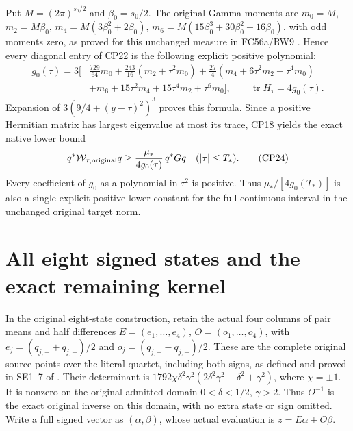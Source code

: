 \documentclass[11pt]{article}
\providecommand{\W}{\mathcal W}
\begin{document}
Put $M=(2\pi)^{s_0/2}$ and $\beta_0=s_0/2$. The original
Gamma moments are
$m_0=M$, $m_2=M\beta_0$,
$m_4=M(3\beta_0^2+2\beta_0)$,
$m_6=M(15\beta_0^3+30\beta_0^2+16\beta_0)$, with odd
moments zero, as proved for this unchanged measure in
FC56a/RW9 \cite{Fable029}. Hence every diagonal entry of CP22 is
the following explicit positive polynomial:
\begin{align}
g_0(\tau)=3\bigg[&
\frac{729}{64}m_0+\frac{243}{16}(m_2+\tau^2m_0)
+\frac{27}{4}(m_4+6\tau^2m_2+\tau^4m_0)\nonumber\\
&+m_6+15\tau^2m_4+15\tau^4m_2+\tau^6m_0\bigg],
\qquad \operatorname{tr}H_\tau=4g_0(\tau).
\tag{CP23}
\end{align}
Expansion of $3(9/4+(y-\tau)^2)^3$ proves this formula.
Since a positive Hermitian matrix has largest eigenvalue
at most its trace, CP18 yields the exact native lower bound
\begin{equation}
q^*\W_{\tau,\rm original}q
\ge\frac{\mu_*}{4g_0(\tau)}\,q^*Gq
\quad(|\tau|\le T_*).
\tag{CP24}
\end{equation}
Every coefficient of $g_0$ as a polynomial in $\tau^2$ is
positive. Thus $\mu_*/[4g_0(T_*)]$ is also a single explicit
positive lower constant for the full continuous interval
in the unchanged original target norm.

\section{All eight signed states and the exact remaining kernel}
In the original eight-state construction, retain the actual
four columns of pair means and half differences
$E=(e_1,\ldots,e_4)$, $O=(o_1,\ldots,o_4)$, with
$e_j=(q_{j,+}+q_{j,-})/2$ and
$o_j=(q_{j,+}-q_{j,-})/2$. These are the complete original
source points over the literal quartet, including both signs,
as defined and proved in SE1--7 of \cite{Fable029}. Their determinant
is
$1792\chi\delta^2\gamma^2(2\delta^2\gamma^2-\delta^2+\gamma^2)$,
where $\chi=\pm1$. It is nonzero on the original admitted
domain $0<\delta<1/2$, $\gamma>2$. Thus $O^{-1}$ is the
exact original inverse on this domain, with no extra state
or sign omitted. Write a full signed vector as $(\alpha,\beta)$,
whose actual evaluation is $z=E\alpha+O\beta$.
\end{document}
